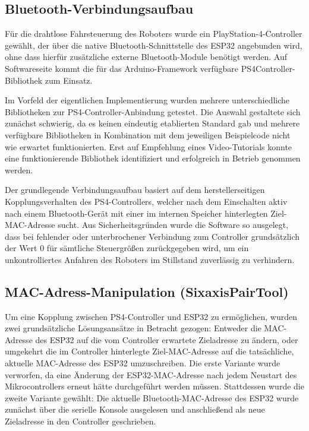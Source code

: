 \documentclass[12pt,ngerman,numbers=noenddot,abstracton,headsepline]{scrreprt}
\begin{document}
\subsection{Bluetooth-Verbindungsaufbau}
\label{subsec:ps4_bluetooth}

Für die drahtlose Fahrsteuerung des Roboters wurde ein PlayStation-4-Controller gewählt, der über die native Bluetooth-Schnittstelle des ESP32 angebunden wird, ohne dass hierfür zusätzliche externe Bluetooth-Module benötigt werden. Auf Softwareseite kommt die für das Arduino-Framework verfügbare PS4Controller-Bibliothek zum Einsatz.

Im Vorfeld der eigentlichen Implementierung wurden mehrere unterschiedliche Bibliotheken zur PS4-Controller-Anbindung getestet. Die Auswahl gestaltete sich zunächst schwierig, da es keinen eindeutig etablierten Standard gab und mehrere verfügbare Bibliotheken in Kombination mit dem jeweiligen Beispielcode nicht wie erwartet funktionierten. Erst auf Empfehlung eines Video-Tutorials konnte eine funktionierende Bibliothek identifiziert und erfolgreich in Betrieb genommen werden.

Der grundlegende Verbindungsaufbau basiert auf dem herstellerseitigen Kopplungsverhalten des PS4-Controllers, welcher nach dem Einschalten aktiv nach einem Bluetooth-Gerät mit einer im internen Speicher hinterlegten Ziel-MAC-Adresse sucht. Aus Sicherheitsgründen wurde die Software so ausgelegt, dass bei fehlender oder unterbrochener Verbindung zum Controller grundsätzlich der Wert 0 für sämtliche Steuergrößen zurückgegeben wird, um ein unkontrolliertes Anfahren des Roboters im Stillstand zuverlässig zu verhindern.

\subsection{MAC-Adress-Manipulation (SixaxisPairTool)}
\label{subsec:mac_manipulation}

Um eine Kopplung zwischen PS4-Controller und ESP32 zu ermöglichen, wurden zwei grundsätzliche Lösungsansätze in Betracht gezogen: Entweder die MAC-Adresse des ESP32 auf die vom Controller erwartete Zieladresse zu ändern, oder umgekehrt die im Controller hinterlegte Ziel-MAC-Adresse auf die tatsächliche, aktuelle MAC-Adresse des ESP32 umzuschreiben. Die erste Variante wurde verworfen, da eine Änderung der ESP32-MAC-Adresse nach jedem Neustart des Mikrocontrollers erneut hätte durchgeführt werden müssen. Stattdessen wurde die zweite Variante gewählt: Die aktuelle Bluetooth-MAC-Adresse des ESP32 wurde zunächst über die serielle Konsole ausgelesen und anschließend als neue Zieladresse in den Controller geschrieben.
\end{document}
